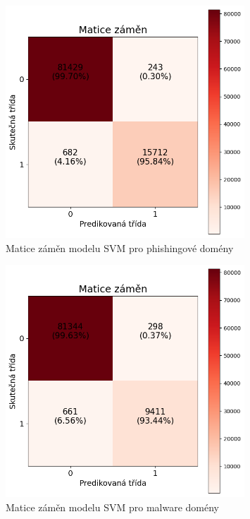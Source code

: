 \begin{figure}[H]
    \centering
    \includegraphics[width=0.8\textwidth]{obrazky-figures/svm_stage_3_phishing_v1.1_confusion_matrix.png}
    \caption{Matice záměn modelu SVM pro phishingové domény}
    \label{fig:svm_conf_matrix_phishing}
\end{figure}

\begin{figure}[H]
    \centering
    \includegraphics[width=0.8\textwidth]{obrazky-figures/svm_stage_3_malware_v1.1_confusion_matrix.png}
    \caption{Matice záměn modelu SVM pro malware domény}
    \label{fig:svm_conf_matrix_malware}
\end{figure}

